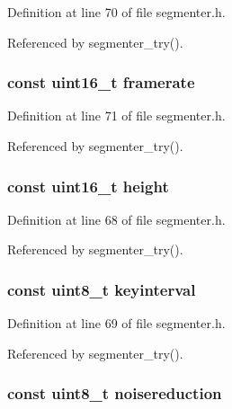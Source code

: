 \-Definition at line 70 of file segmenter.\-h.



\-Referenced by segmenter\-\_\-try().

\hypertarget{struct__video__params_a1d547da47827122cb857d138cd40d03d}{
\subsubsection[{framerate}]{\setlength{\rightskip}{0pt plus 5cm}const uint16\-\_\-t {\bf framerate}}}\label{struct__video__params_a1d547da47827122cb857d138cd40d03d}


\-Definition at line 71 of file segmenter.\-h.



\-Referenced by segmenter\-\_\-try().

\hypertarget{struct__video__params_a08b719f21fdd4b4a8646070080cccbf9}{
\subsubsection[{height}]{\setlength{\rightskip}{0pt plus 5cm}const uint16\-\_\-t {\bf height}}}\label{struct__video__params_a08b719f21fdd4b4a8646070080cccbf9}


\-Definition at line 68 of file segmenter.\-h.



\-Referenced by segmenter\-\_\-try().

\hypertarget{struct__video__params_a742eca362410fabc25b1403e42afdf6f}{
\subsubsection[{keyinterval}]{\setlength{\rightskip}{0pt plus 5cm}const uint8\-\_\-t {\bf keyinterval}}}\label{struct__video__params_a742eca362410fabc25b1403e42afdf6f}


\-Definition at line 69 of file segmenter.\-h.



\-Referenced by segmenter\-\_\-try().

\hypertarget{struct__video__params_a55d36111de9687dc3e70d2aaeb13c47f}{
\subsubsection[{noisereduction}]{\setlength{\rightskip}{0pt plus 5cm}const uint8\-\_\-t {\bf noisereduction}}}\label{struct__video__params_a55d36111de9687dc3e70d2aaeb13c47f}


